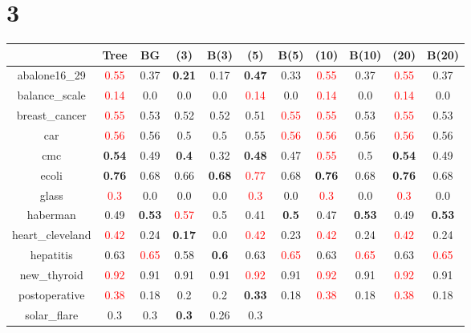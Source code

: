 \documentclass{article}%
\begin{document}
\section*{3}%
\begin{tabular}{c|cccccccccc}%
\hline%
&Tree&BG&(3)&B(3)&(5)&B(5)&(10)&B(10)&(20)&B(20)\\%
\hline%
abalone16\_29&\textcolor{red}{ 
0.55
}&0.37&\textbf{0.21}&0.17&\textbf{0.47}&0.33&\textcolor{red}{ 
0.55
}&0.37&\textcolor{red}{ 
0.55
}&0.37\\%
\hline%
balance\_scale&\textcolor{red}{ 
0.14
}&0.0&0.0&0.0&\textcolor{red}{ 
0.14
}&0.0&\textcolor{red}{ 
0.14
}&0.0&\textcolor{red}{ 
0.14
}&0.0\\%
\hline%
breast\_cancer&\textcolor{red}{ 
0.55
}&0.53&0.52&0.52&0.51&\textcolor{red}{ 
0.55
}&\textcolor{red}{ 
0.55
}&0.53&\textcolor{red}{ 
0.55
}&0.53\\%
\hline%
car&\textcolor{red}{ 
0.56
}&0.56&0.5&0.5&0.55&\textcolor{red}{ 
0.56
}&\textcolor{red}{ 
0.56
}&0.56&\textcolor{red}{ 
0.56
}&0.56\\%
\hline%
cmc&\textbf{0.54}&0.49&\textbf{0.4}&0.32&\textbf{0.48}&0.47&\textcolor{red}{ 
0.55
}&0.5&\textbf{0.54}&0.49\\%
\hline%
ecoli&\textbf{0.76}&0.68&0.66&\textbf{0.68}&\textcolor{red}{ 
0.77
}&0.68&\textbf{0.76}&0.68&\textbf{0.76}&0.68\\%
\hline%
glass&\textcolor{red}{ 
0.3
}&0.0&0.0&0.0&\textcolor{red}{ 
0.3
}&0.0&\textcolor{red}{ 
0.3
}&0.0&\textcolor{red}{ 
0.3
}&0.0\\%
\hline%
haberman&0.49&\textbf{0.53}&\textcolor{red}{ 
0.57
}&0.5&0.41&\textbf{0.5}&0.47&\textbf{0.53}&0.49&\textbf{0.53}\\%
\hline%
heart\_cleveland&\textcolor{red}{ 
0.42
}&0.24&\textbf{0.17}&0.0&\textcolor{red}{ 
0.42
}&0.23&\textcolor{red}{ 
0.42
}&0.24&\textcolor{red}{ 
0.42
}&0.24\\%
\hline%
hepatitis&0.63&\textcolor{red}{ 
0.65
}&0.58&\textbf{0.6}&0.63&\textcolor{red}{ 
0.65
}&0.63&\textcolor{red}{ 
0.65
}&0.63&\textcolor{red}{ 
0.65
}\\%
\hline%
new\_thyroid&\textcolor{red}{ 
0.92
}&0.91&0.91&0.91&\textcolor{red}{ 
0.92
}&0.91&\textcolor{red}{ 
0.92
}&0.91&\textcolor{red}{ 
0.92
}&0.91\\%
\hline%
postoperative&\textcolor{red}{ 
0.38
}&0.18&0.2&0.2&\textbf{0.33}&0.18&\textcolor{red}{ 
0.38
}&0.18&\textcolor{red}{ 
0.38
}&0.18\\%
\hline%
solar\_flare&0.3&0.3&\textbf{0.3}&0.26&0.3&\textcolor{red}{ 
}
\end{tabular}
\end{document}
